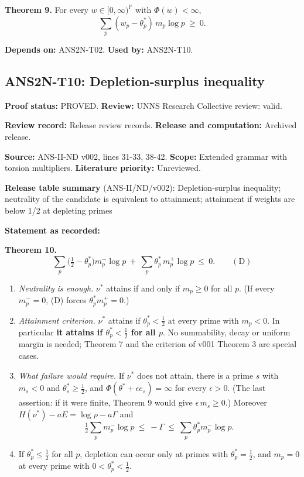 \documentclass[
  11pt,
]{article}
\providecommand{\tightlist}{%
  \setlength{\itemsep}{0pt}\setlength{\parskip}{0pt}}
\begin{document}
\textbf{Theorem 9.} For every \(w\in[0,\infty)^{\mathbb P}\) with
\(\Phi(w)<\infty\), \[\sum_p(w_p-\theta^\ast_p)\,m_p\log p\ \ge\ 0 .\]

\textbf{Depends on:} ANS2N-T02. \textbf{Used by:} ANS2N-T10.

\hypertarget{ans2n-t10-depletion-surplus-inequality}{%
\subsection{ANS2N-T10: Depletion-surplus
inequality}\label{ans2n-t10-depletion-surplus-inequality}}

\textbf{Proof status:} PROVED. \textbf{Review:} UNNS Research Collective
review: valid.

\textbf{Review record:} Release review records. \textbf{Release and
computation:} Archived release.

\textbf{Source:} ANS-II-ND v002, lines 31-33, 38-42. \textbf{Scope:}
Extended grammar with torsion multipliers. \textbf{Literature priority:}
Unreviewed.

\textbf{Release table summary} (ANS-II/ND/v002): Depletion-surplus
inequality; neutrality of the candidate is equivalent to attainment;
attainment if weights are below 1/2 at depleting primes

\textbf{Statement as recorded:}

\textbf{Theorem 10.}
\[\sum_p\Big(\tfrac12-\theta^\ast_p\Big)m_p^-\log p\ +\ \sum_p\theta^\ast_p\,m_p^+\log p\ \le\ 0 .\qquad(\mathrm D)\]

\begin{enumerate}
\def\labelenumi{\arabic{enumi}.}
\tightlist
\item
  \emph{Neutrality is enough.} \(\nu^\ast\) attains if and only if
  \(m_p\ge0\) for all \(p\). (If every \(m_p^-=0\), (D) forces
  \(\theta^\ast_pm_p^+=0\).)
\item
  \emph{Attainment criterion.} \(\nu^\ast\) attains if
  \(\theta^\ast_p<\frac12\) at every prime with \(m_p<0\). In particular
  \textbf{it attains if \(\theta^\ast_p<\frac12\) for all \(p\)}. No
  summability, decay or uniform margin is needed; Theorem 7 and the
  criterion of v001 Theorem 3 are special cases.
\item
  \emph{What failure would require.} If \(\nu^\ast\) does not attain,
  there is a prime \(s\) with \(m_s<0\) and \(\theta^\ast_s\ge\frac12\),
  and \(\Phi(\theta^\ast+\epsilon e_s)=\infty\) for every
  \(\epsilon>0\). (The last assertion: if it were finite, Theorem 9
  would give \(\epsilon\,m_s\ge0\).) Moreover
  \(H(\nu^\ast)-aE=\log\rho-a\Gamma\) and
  \[\tfrac12\sum_pm_p^-\log p\ \le\ -\Gamma\ \le\ \sum_p\theta^\ast_pm_p^-\log p .\]
\item
  If \(\theta^\ast_p\le\frac12\) for all \(p\), depletion can occur only
  at primes with \(\theta^\ast_p=\frac12\), and \(m_p=0\) at every prime
  with \(0<\theta^\ast_p<\frac12\).
\end{enumerate}
\end{document}

